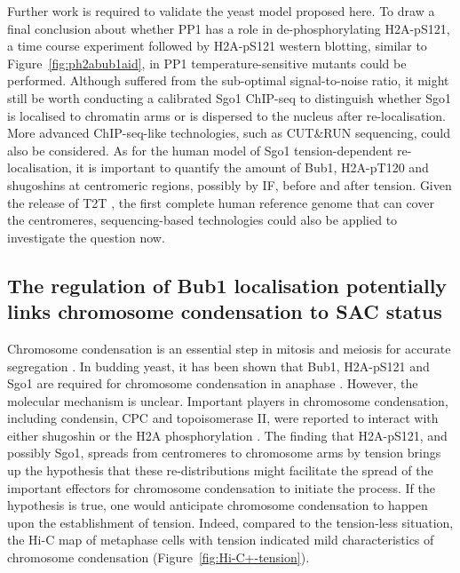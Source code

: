 Further work is required to validate the yeast model proposed here. To draw a final conclusion about whether PP1 has a role in de-phosphorylating H2A-pS121, a time course experiment followed by H2A-pS121 western blotting, similar to Figure~\ref{fig:ph2abub1aid}, in PP1 temperature-sensitive mutants could be performed. Although suffered from the sub-optimal signal-to-noise ratio, it might still be worth conducting a calibrated Sgo1 ChIP-seq to distinguish whether Sgo1 is localised to chromatin arms or is dispersed to the nucleus after re-localisation. More advanced ChIP-seq-like technologies, such as CUT\&RUN sequencing, could also be considered. As for the human model of Sgo1 tension-dependent re-localisation, it is important to quantify the amount of Bub1, H2A-pT120 and shugoshins at centromeric regions, possibly by IF, before and after tension. Given the release of T2T \citep{Nurk2022TheGenome}, the first complete human reference genome that can cover the centromeres, sequencing-based technologies could also be applied to investigate the question now. 


\subsection{The regulation of Bub1 localisation potentially links chromosome condensation to SAC status}

Chromosome condensation is an essential step in mitosis and meiosis for accurate segregation \citep{Antonin2016ChromosomeMitosis, Piskadlo2016NovelCondensation, Beseda2020MitoticVariability, Takahashi2019FoldingChromosomes}. In budding yeast, it has been shown that Bub1, H2A-pS121 and Sgo1 are required for chromosome condensation in anaphase \citep{Kruitwagen2018}. However, the molecular mechanism is unclear. Important players in chromosome condensation, including condensin, CPC and topoisomerase II, were reported to interact with either shugoshin or the H2A phosphorylation \citep{Zhang2020FunctioningMitosis, Verzijlbergen2014, Yahya2020, Abad2022MechanisticCPC}. The finding that H2A-pS121, and possibly Sgo1, spreads from centromeres to chromosome arms by tension brings up the hypothesis that these re-distributions might facilitate the spread of the important effectors for chromosome condensation to initiate the process. If the hypothesis is true, one would anticipate chromosome condensation to happen upon the establishment of tension. Indeed, compared to the tension-less situation, the Hi-C map of metaphase cells with tension indicated mild characteristics of chromosome condensation (Figure~\ref{fig:Hi-C+-tension}). 

